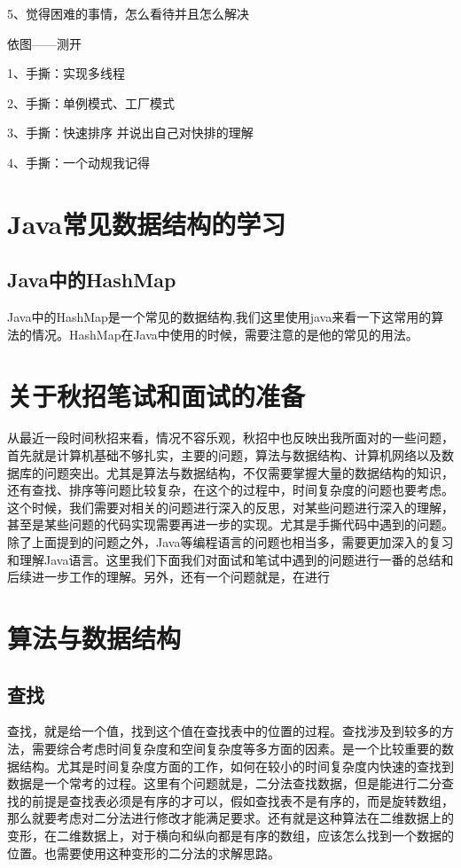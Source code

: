 \documentclass[UTF8]{ctexart}
\begin{document}
5、觉得困难的事情，怎么看待并且怎么解决

依图——测开

1、手撕：实现多线程

2、手撕：单例模式、工厂模式

3、手撕：快速排序 并说出自己对快排的理解

4、手撕：一个动规我记得

\section{Java常见数据结构的学习}
\subsection{Java中的HashMap}
Java中的HashMap是一个常见的数据结构,我们这里使用java来看一下这常用的算法的情况。HashMap在Java中使用的时候，需要注意的是他的常见的用法。






\section{关于秋招笔试和面试的准备}
从最近一段时间秋招来看，情况不容乐观，秋招中也反映出我所面对的一些问题，首先就是计算机基础不够扎实，主要的问题，算法与数据结构、计算机网络以及数据库的问题突出。尤其是算法与数据结构，不仅需要掌握大量的数据结构的知识，还有查找、排序等问题比较复杂，在这个的过程中，时间复杂度的问题也要考虑。这个时候，我们需要对相关的问题进行深入的反思，对某些问题进行深入的理解，甚至是某些问题的代码实现需要再进一步的实现。尤其是手撕代码中遇到的问题。除了上面提到的问题之外，Java等编程语言的问题也相当多，需要更加深入的复习和理解Java语言。这里我们下面我们对面试和笔试中遇到的问题进行一番的总结和后续进一步工作的理解。另外，还有一个问题就是，在进行\\
\section{算法与数据结构}
\subsection{查找}
查找，就是给一个值，找到这个值在查找表中的位置的过程。查找涉及到较多的方法，需要综合考虑时间复杂度和空间复杂度等多方面的因素。是一个比较重要的数据结构。尤其是时间复杂度方面的工作，如何在较小的时间复杂度内快速的查找到数据是一个常考的过程。这里有个问题就是，二分法查找数据，但是能进行二分查找的前提是查找表必须是有序的才可以，假如查找表不是有序的，而是旋转数组，那么就要考虑对二分法进行修改才能满足要求。还有就是这种算法在二维数据上的变形，在二维数据上，对于横向和纵向都是有序的数组，应该怎么找到一个数据的位置。也需要使用这种变形的二分法的求解思路。
\end{document}
